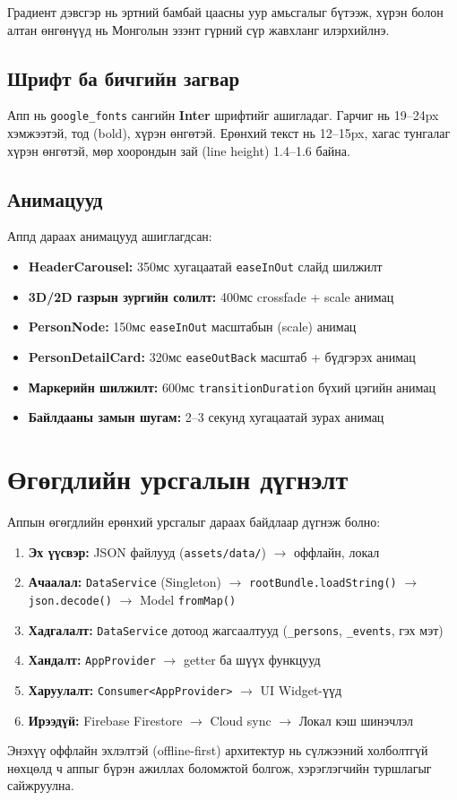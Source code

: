 Градиент дэвсгэр нь эртний бамбай цаасны уур амьсгалыг бүтээж, хүрэн болон алтан өнгөнүүд нь Монголын эзэнт гүрний сүр жавхланг илэрхийлнэ.

\subsection{Шрифт ба бичгийн загвар}

Апп нь \texttt{google\_fonts} сангийн \textbf{Inter} шрифтийг ашигладаг. Гарчиг нь 19--24px хэмжээтэй, тод (bold), хүрэн өнгөтэй. Ерөнхий текст нь 12--15px, хагас тунгалаг хүрэн өнгөтэй, мөр хоорондын зай (line height) 1.4--1.6 байна.

\subsection{Анимацууд}

Аппд дараах анимацууд ашиглагдсан:
\begin{itemize}
	\item \textbf{HeaderCarousel:} 350мс хугацаатай \texttt{easeInOut} слайд шилжилт
	\item \textbf{3D/2D газрын зургийн солилт:} 400мс crossfade + scale анимац
	\item \textbf{PersonNode:} 150мс \texttt{easeInOut} масштабын (scale) анимац
	\item \textbf{PersonDetailCard:} 320мс \texttt{easeOutBack} масштаб + бүдгэрэх анимац
	\item \textbf{Маркерийн шилжилт:} 600мс \texttt{transitionDuration} бүхий цэгийн анимац
	\item \textbf{Байлдааны замын шугам:} 2--3 секунд хугацаатай зурах анимац
\end{itemize}

\section{Өгөгдлийн урсгалын дүгнэлт}

Аппын өгөгдлийн ерөнхий урсгалыг дараах байдлаар дүгнэж болно:

\begin{enumerate}
	\item \textbf{Эх үүсвэр:} JSON файлууд (\texttt{assets/data/}) $\rightarrow$ оффлайн, локал
	\item \textbf{Ачаалал:} \texttt{DataService} (Singleton) $\rightarrow$ \texttt{rootBundle.loadString()} $\rightarrow$ \texttt{json.decode()} $\rightarrow$ Model \texttt{fromMap()}
	\item \textbf{Хадгалалт:} \texttt{DataService} дотоод жагсаалтууд (\texttt{\_persons}, \texttt{\_events}, гэх мэт)
	\item \textbf{Хандалт:} \texttt{AppProvider} $\rightarrow$ getter ба шүүх функцууд
	\item \textbf{Харуулалт:} \texttt{Consumer<AppProvider>} $\rightarrow$ UI Widget-үүд
	\item \textbf{Ирээдүй:} Firebase Firestore $\rightarrow$ Cloud sync $\rightarrow$ Локал кэш шинэчлэл
\end{enumerate}

Энэхүү оффлайн эхлэлтэй (offline-first) архитектур нь сүлжээний холболтгүй нөхцөлд ч аппыг бүрэн ажиллах боломжтой болгож, хэрэглэгчийн туршлагыг сайжруулна.
